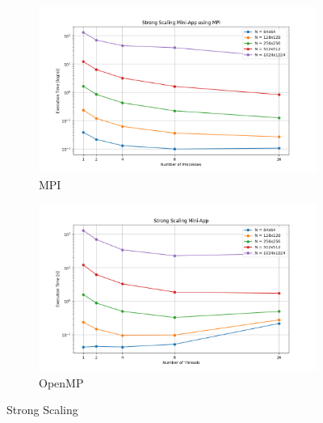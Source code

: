\begin{figure}[H]
	\centering
	\begin{subfigure}{0.8\textwidth}
		\includegraphics[width=\textwidth]{./media/strong_scaling.png}
		\caption{MPI}
		\label{fig:mpi-strong}
	\end{subfigure}
	\begin{subfigure}{0.8\textwidth}
		\includegraphics[width=\textwidth]{./media/strong_scaling_omp.png}
		\caption{OpenMP}
		\label{fig:openmp-strong}
	\end{subfigure}
	\caption{Strong Scaling}
	\label{fig:strong_scaling}
\end{figure}
